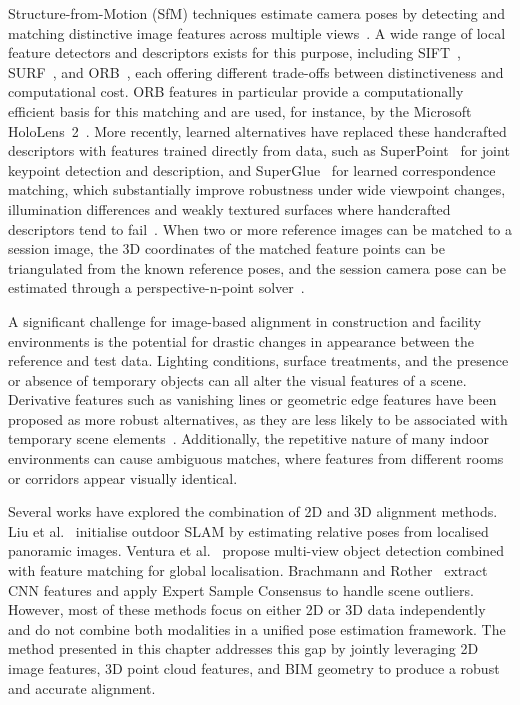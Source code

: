 Structure-from-Motion (\gls{SfM}) techniques estimate camera poses by detecting and matching distinctive image features across multiple views~\cite{schonberger_structure--motion_2016}. A wide range of local feature detectors and descriptors exists for this purpose, including SIFT~\cite{sun_sift_2014}, SURF~\cite{bay_speeded-up_2008}, and \gls{ORB}~\cite{rublee_orb_2011}, each offering different trade-offs between distinctiveness and computational cost. \gls{ORB} features in particular provide a computationally efficient basis for this matching and are used, for instance, by the Microsoft HoloLens~2~\cite{cyrus_hololens_2019}. More recently, learned alternatives have replaced these handcrafted descriptors with features trained directly from data, such as SuperPoint~\cite{detone_superpoint_2018} for joint keypoint detection and description, and SuperGlue~\cite{sarlin_superglue_2020} for learned correspondence matching, which substantially improve robustness under wide viewpoint changes, illumination differences and weakly textured surfaces where handcrafted descriptors tend to fail~\cite{jin_image_2021}. When two or more reference images can be matched to a session image, the 3D coordinates of the matched feature points can be triangulated from the known reference poses, and the session camera pose can be estimated through a perspective-n-point solver~\cite{jinyu_survey_2019}.

A significant challenge for image-based alignment in construction and facility environments is the potential for drastic changes in appearance between the reference and test data. Lighting conditions, surface treatments, and the presence or absence of temporary objects can all alter the visual features of a scene. Derivative features such as vanishing lines or geometric edge features have been proposed as more robust alternatives, as they are less likely to be associated with temporary scene elements~\cite{zollmann_augmented_2014}. Additionally, the repetitive nature of many indoor environments can cause ambiguous matches, where features from different rooms or corridors appear visually identical.

Several works have explored the combination of 2D and 3D alignment methods. Liu et al.~\cite{liu_instant_2018} initialise outdoor SLAM by estimating relative poses from localised panoramic images. Ventura et al.~\cite{ventura_global_2014} propose multi-view object detection combined with feature matching for global localisation. Brachmann and Rother~\cite{brachmann_expert_2019} extract CNN features and apply Expert Sample Consensus to handle scene outliers. However, most of these methods focus on either 2D or 3D data independently and do not combine both modalities in a unified pose estimation framework. The method presented in this chapter addresses this gap by jointly leveraging 2D image features, 3D point cloud features, and BIM geometry to produce a robust and accurate alignment.

